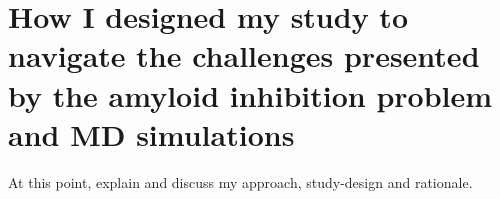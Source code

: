\section{How I designed my study to navigate the challenges presented by the amyloid inhibition problem and MD simulations}
At this point, explain and discuss my approach, study-design and rationale.







% 
% 
% 
% 
% 


